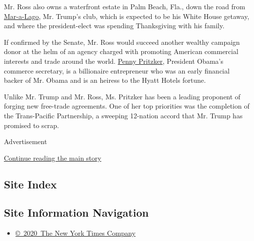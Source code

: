 Mr. Ross also owns a waterfront estate in Palm Beach, Fla., down the
road from
\href{http://www.nytimes.com/2016/11/23/us/politics/trumps-palm-beach-neighbors-shrug-and-say-theyve-seen-it-before.html}{Mar-a-Lago},
Mr. Trump's club, which is expected to be his White House getaway, and
where the president-elect was spending Thanksgiving with his family.

If confirmed by the Senate, Mr. Ross would succeed another wealthy
campaign donor at the helm of an agency charged with promoting American
commercial interests and trade around the world.
\href{http://www.nytimes.com/2015/10/09/business/penny-pritzker-tackles-tough-assignments-as-commerce-secretary.html}{Penny
Pritzker}, President Obama's commerce secretary, is a billionaire
entrepreneur who was an early financial backer of Mr. Obama and is an
heiress to the Hyatt Hotels fortune.

Unlike Mr. Trump and Mr. Ross, Ms. Pritzker has been a leading proponent
of forging new free-trade agreements. One of her top priorities was the
completion of the Trans-Pacific Partnership, a sweeping 12-nation accord
that Mr. Trump has promised to scrap.

Advertisement

\protect\hyperlink{after-bottom}{Continue reading the main story}

\hypertarget{site-index}{%
\subsection{Site Index}\label{site-index}}

\hypertarget{site-information-navigation}{%
\subsection{Site Information
Navigation}\label{site-information-navigation}}

\begin{itemize}
\tightlist
\item
  \href{https://help.nytimes.com/hc/en-us/articles/115014792127-Copyright-notice}{©~2020~The
  New York Times Company}
\end{itemize}

